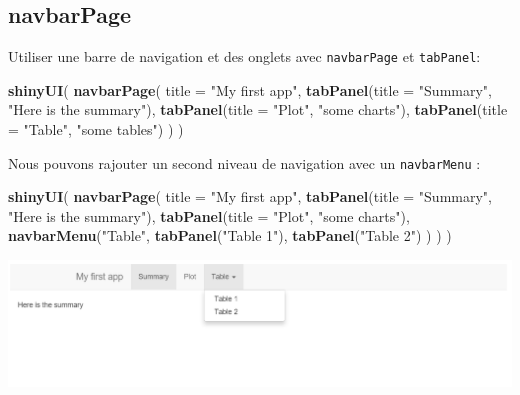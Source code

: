 \documentclass[]{article}
\newenvironment{Shaded}{\begin{snugshade}}{\end{snugshade}}
\newcommand{\KeywordTok}[1]{\textcolor[rgb]{0.13,0.29,0.53}{\textbf{#1}}}
\newcommand{\DataTypeTok}[1]{\textcolor[rgb]{0.13,0.29,0.53}{#1}}
\newcommand{\StringTok}[1]{\textcolor[rgb]{0.31,0.60,0.02}{#1}}
\newcommand{\NormalTok}[1]{#1}
\begin{document}
\subsection{navbarPage}\label{navbarpage}

Utiliser une barre de navigation et des onglets avec \texttt{navbarPage}
et \texttt{tabPanel}:

\begin{Shaded}
\begin{Highlighting}[]
\KeywordTok{shinyUI}\NormalTok{(}
  \KeywordTok{navbarPage}\NormalTok{(}
    \DataTypeTok{title =} \StringTok{"My first app"}\NormalTok{,}
    \KeywordTok{tabPanel}\NormalTok{(}\DataTypeTok{title =} \StringTok{"Summary"}\NormalTok{,}
             \StringTok{"Here is the summary"}\NormalTok{),}
    \KeywordTok{tabPanel}\NormalTok{(}\DataTypeTok{title =} \StringTok{"Plot"}\NormalTok{,}
             \StringTok{"some charts"}\NormalTok{),}
    \KeywordTok{tabPanel}\NormalTok{(}\DataTypeTok{title =} \StringTok{"Table"}\NormalTok{,}
             \StringTok{"some tables"}\NormalTok{)}
\NormalTok{  )}
\NormalTok{)}
\end{Highlighting}
\end{Shaded}

Nous pouvons rajouter un second niveau de navigation avec un
\texttt{navbarMenu} :

\begin{Shaded}
\begin{Highlighting}[]
\KeywordTok{shinyUI}\NormalTok{(}
  \KeywordTok{navbarPage}\NormalTok{(}
    \DataTypeTok{title =} \StringTok{"My first app"}\NormalTok{,}
    \KeywordTok{tabPanel}\NormalTok{(}\DataTypeTok{title =} \StringTok{"Summary"}\NormalTok{,}
             \StringTok{"Here is the summary"}\NormalTok{),}
    \KeywordTok{tabPanel}\NormalTok{(}\DataTypeTok{title =} \StringTok{"Plot"}\NormalTok{,}
             \StringTok{"some charts"}\NormalTok{),}
    \KeywordTok{navbarMenu}\NormalTok{(}\StringTok{"Table"}\NormalTok{,}
               \KeywordTok{tabPanel}\NormalTok{(}\StringTok{"Table 1"}\NormalTok{),}
               \KeywordTok{tabPanel}\NormalTok{(}\StringTok{"Table 2"}\NormalTok{)}
\NormalTok{    )}
\NormalTok{  )}
\NormalTok{)}
\end{Highlighting}
\end{Shaded}

\includegraphics{img/navbar.png}
\end{document}
